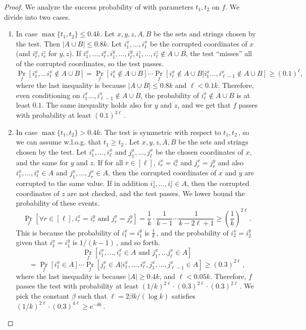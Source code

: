 \documentclass[11pt]{article}
\numberwithin{equation}{section}
\theoremstyle{definition}
\theoremstyle{plain}
\newcommand{\eee}{\mathrm e}
\newcommand{\Paren}[1]{\left(#1\right)} %
\newcommand{\abs}[1]{\lvert#1\rvert} %
\newcommand\f{f} %
\begin{document}
\begin{proof}
    We analyze the success probability of  with parameters $t_1,t_2$ on $\f$. We divide into two cases.
    \begin{enumerate}
        \item{In case $\max\{t_1,t_2\}\leq 0.4k$.} Let $x,y,z,A,B$ be the sets and strings chosen by the test. Then $\abs{A\cup B}\leq 0.8k$. Let $i_1^x,\ldots, i_\ell^x$ be the corrupted coordinates of $x$ (and $i_r^y,i_r^z$ for $y,z$). If $i_1^x,\ldots, i_\ell^x,i_1^y,\ldots, i_\ell^y,i_1^z,\ldots, i_\ell^z\notin A\cup B$, the test ``misses'' all of the corrupted coordinates, so the test passes. 
    \[ \Pr_f[i_1^x,\ldots i_\ell^x\notin A\cup B]=\Pr_f[i_1^x\notin A\cup B]\cdots\Pr_f[i_\ell^x\notin A\cup B|i_1^x\ldots, i_{\ell-1}^x\notin A\cup B]\geq (0.1)^\ell, \]
    where the last inequality is because $\abs{A\cup B}\leq 0.8k$ and $\ell < 0.1k$. Therefore, even conditioning on $i_1^x\ldots, i_{\ell-1}^x\notin A\cup B$, the probability of $i^x_\ell\notin A\cup B$ is at least $0.1$.
    The same inequality holds also for $y$ and $z$, and we get that $\f$ passes  with probability at least $(0.1)^{3\ell}$\,.
    \item {In case $\max\{t_1,t_2\}> 0.4k$.} The test is symmetric with respect to $t_1,t_2$\,, so we can assume w.l.o.g. that $t_1\geq t_2$\,. Let $x,y,z,A,B$ be the sets and strings chosen by the test. Let $i_1^x,\ldots, i_\ell^x$ and $j_1^x,\ldots, j_\ell^x$ be the chosen coordinates of $x$, and the same for $y$ and $z$. If for all $r\in[\ell]$, $i_r^x = i_r^y$ and $j_r^x = j_r^y$ and also $i_1^x,\ldots, i_\ell^x\in A$ and $j_1^x,\ldots, j_r^x\in A$, then the corrupted coordinates of $x$ and $y$ are corrupted to the same value. If in addition $ i_1^z,\ldots, i_\ell^z\in A$, then the corrupted coordinates of $z$ are not checked, and the test passes. We lower bound the probability of these events.
    \[ \Pr_f[\forall r\in[\ell], i_r^x = i_r^y \textrm{ and } j_r^x = j_r^y] =\frac{1}{k}\cdot\frac{1}{k-1}\cdots\frac{1}{k-2\ell+1} \geq\Paren{\frac{1}{k}}^{2\ell}\,. \]%
    This is because the probability of $i_1^x = i_1^y$ is $\frac{1}{k}$\,, and the probability of $i_2^x = i_2^y$ given that $i_1^x = i_1^y$ is 
%
%
$1/(k-1)$\,,  %
and so forth.
 $$\Pr_f[i_1^x,\ldots, i_\ell^x\in A\textrm{ and }j_1^x,\ldots j_\ell^x\in A] $$ %
$$ =\Pr_f[i_1^x\in A]\cdots\Pr_f[j_\ell^x\in A|i_1^x,\ldots, i_\ell^x,j_1^x,\ldots, j_{\ell-1}^x\in A]\geq (0.3)^{2\ell}\,, $$
where the last inequality is because $\abs{A}\geq 0.4k$, and $\ell < 0.05k$.
	Therefore, $\f$ passes the test with probability at least 
    $\Paren{1/k}^{2\ell}\cdot (0.3)^{2\ell}\cdot (0.3)^{2\ell}$\,. %
%
 We pick the constant $\beta$ such that 
    $\ell = {2\beta k}/{(\log k)}$ %
     satisfies 
    $\Paren{{1}/{k}}^{2\ell}\cdot (0.3)^{4\ell}\geq \eee^{-\delta k}$\,. %
\end{enumerate}
    

\end{proof}
\end{document}
